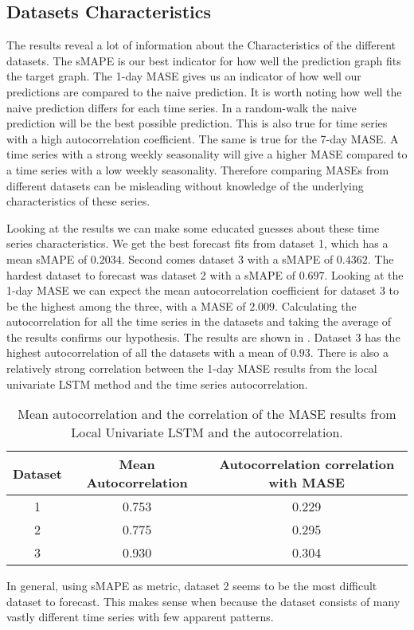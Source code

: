 
\subsection{Datasets Characteristics}
The results reveal a lot of information about the Characteristics of the different datasets.
The sMAPE is our best indicator for how well the prediction graph fits the target graph.
The 1-day MASE gives us an indicator of how well our predictions are compared to the naive
prediction. It is worth noting how well the naive prediction differs
for each time series. In a random-walk the naive prediction will be the best possible prediction.
This is also true for time series with a high autocorrelation coefficient.
The same is true for the 7-day MASE. A time series with a strong weekly seasonality will
give a higher MASE compared to a time series with a low weekly seasonality.
Therefore comparing MASEs from different datasets can be misleading without knowledge of
the underlying characteristics of these series.

Looking at the results we can make some educated guesses about these time series characteristics.
We get the best forecast fits from dataset 1, which has a mean sMAPE of $0.2034$.
Second comes dataset 3 with a sMAPE of $0.4362$. The hardest dataset to forecast was dataset 2 with a
sMAPE of $0.697$. Looking at the 1-day MASE we can expect the mean autocorrelation coefficient for
dataset 3 to be the highest among the three, with a MASE of $2.009$.
Calculating the autocorrelation for all the time series in the datasets and
taking the average of the results confirms our hypothesis. The results are shown in .
Dataset 3 has the highest autocorrelation of all the datasets with a mean
of $0.93$. There is also a relatively strong correlation between the 1-day MASE results
from the local univariate LSTM method and the time series autocorrelation.

\begin{table}[htbp]
  \caption{Mean autocorrelation and the correlation of the MASE results from Local Univariate LSTM and the autocorrelation.}
  \centering
  \label{tab:datasets-autocorrelation}
  \begin{tabular}{|c|c|c|}\hline\hline
    Dataset & Mean Autocorrelation & Autocorrelation correlation with MASE \\\hline
    1       & 0.753                & 0.229                                 \\\hline
    2       & 0.775                & 0.295                                 \\\hline
    3       & 0.930                & 0.304                                 \\\hline
  \end{tabular}
\end{table}%


In general, using sMAPE as metric, dataset 2 seems to be the most difficult dataset to forecast.
This makes sense when because the dataset consists of many vastly different time series
with few apparent patterns.